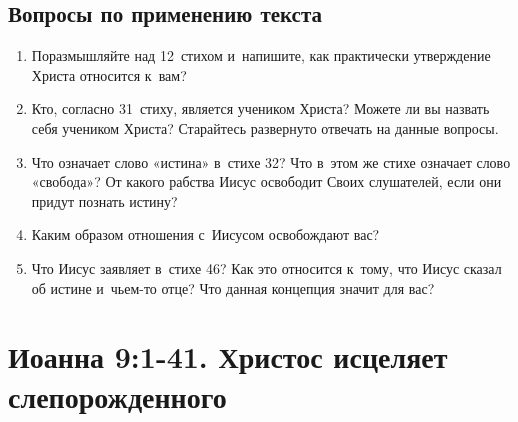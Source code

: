 \documentclass[a4paper,12pt]{article}
\begin{document}
\subsection*{Вопросы по применению текста} 
\begin{enumerate}
    \item Поразмышляйте над 12~стихом и~напишите, как практически утверждение Христа относится к~вам?
    
    \myline
    
    \myline
    \item Кто, согласно 31~стиху, является учеником Христа? Можете ли вы назвать себя учеником Христа? Старайтесь развернуто отвечать на данные вопросы. 
    
    \myline
    
    \myline
    \item Что означает слово «истина» в~стихе 32? Что в~этом же стихе означает слово «свобода»? От какого рабства Иисус освободит Своих слушателей, если они придут познать истину? 
    
    \myline
    
    \myline
    \item Каким образом отношения с~Иисусом освобождают вас? 
    
    \myline
    
    \myline
    \item Что Иисус заявляет в~стихе 46? Как это относится к~тому, что Иисус сказал об истине и~чьем-то отце? Что данная концепция значит для вас?
    
    \myline
    
    \myline
\end{enumerate}



\section{Иоанна 9:1-41. Христос исцеляет слепорожденного}
\end{document}
